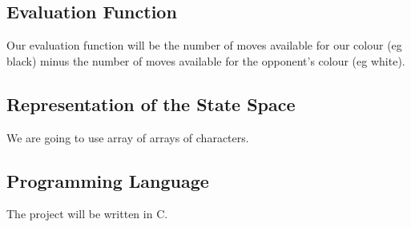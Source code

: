 \documentclass[12pt]{article}
\begin{document}
\subsection*{Evaluation Function}
\quad Our evaluation function will be the number of moves available for our colour (eg black) minus the number of moves available for the opponent's colour (eg white).

\subsection*{Representation of the State Space}
\quad We are going to use array of arrays of characters.

\subsection*{Programming Language}
\quad The project will be written in C.
\end{document}

